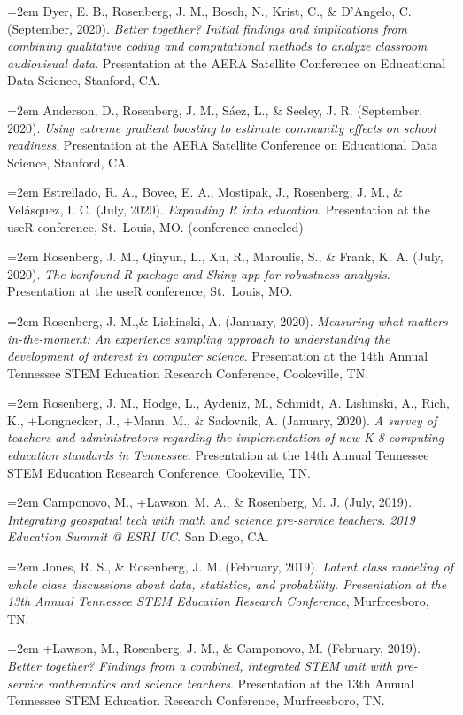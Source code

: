 \documentclass[
  14,
]{article}
\begin{document}
\hangindent=2em Dyer, E. B., Rosenberg, J. M., Bosch, N., Krist, C., \&
D'Angelo, C. (September, 2020). \emph{Better together? Initial findings
and implications from combining qualitative coding and computational
methods to analyze classroom audiovisual data}. Presentation at the AERA
Satellite Conference on Educational Data Science, Stanford, CA.

\hangindent=2em Anderson, D., Rosenberg, J. M., Sáez, L., \& Seeley, J.
R. (September, 2020). \emph{Using extreme gradient boosting to estimate
community effects on school readiness}. Presentation at the AERA
Satellite Conference on Educational Data Science, Stanford, CA.

\hangindent=2em Estrellado, R. A., Bovee, E. A., Mostipak, J.,
Rosenberg, J. M., \& Velásquez, I. C. (July, 2020). \emph{Expanding R
into education}. Presentation at the useR conference, St.~Louis, MO.
(conference canceled)

\hangindent=2em Rosenberg, J. M., Qinyun, L., Xu, R., Maroulis, S., \&
Frank, K. A. (July, 2020). \emph{The konfound R package and Shiny app
for robustness analysis}. Presentation at the useR conference,
St.~Louis, MO.

\hangindent=2em Rosenberg, J. M.,\& Lishinski, A. (January, 2020).
\emph{Measuring what matters in-the-moment: An experience sampling
approach to understanding the development of interest in computer
science}. Presentation at the 14th Annual Tennessee STEM Education
Research Conference, Cookeville, TN.

\hangindent=2em Rosenberg, J. M., Hodge, L., Aydeniz, M., Schmidt, A.
Lishinski, A., Rich, K., +Longnecker, J., +Mann. M., \& Sadovnik, A.
(January, 2020). \emph{A survey of teachers and administrators regarding
the implementation of new K-8 computing education standards in
Tennessee.} Presentation at the 14th Annual Tennessee STEM Education
Research Conference, Cookeville, TN.

\hangindent=2em Camponovo, M., +Lawson, M. A., \& Rosenberg, M. J.
(July, 2019). \emph{Integrating geospatial tech with math and science
pre-service teachers. 2019 Education Summit @ ESRI UC}. San Diego, CA.

\hangindent=2em Jones, R. S., \& Rosenberg, J. M. (February, 2019).
\emph{Latent class modeling of whole class discussions about data,
statistics, and probability. Presentation at the 13th Annual Tennessee
STEM Education Research Conference}, Murfreesboro, TN.

\hangindent=2em +Lawson, M., Rosenberg, J. M., \& Camponovo, M.
(February, 2019). \emph{Better together? Findings from a combined,
integrated STEM unit with pre-service mathematics and science teachers}.
Presentation at the 13th Annual Tennessee STEM Education Research
Conference, Murfreesboro, TN.
\end{document}

